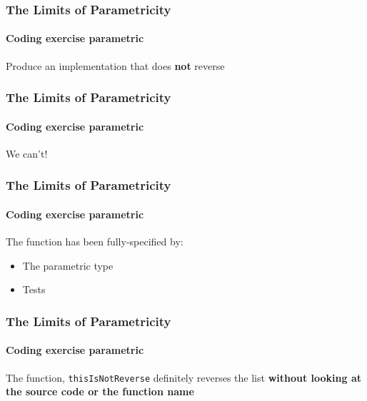 \begin{frame}[fragile]
\frametitle{The Limits of Parametricity}
\framesubtitle{Coding exercise \textemdash parametric}
\begin{block}{Produce an implementation that does \textbf{not} reverse}

\end{block}
\end{frame}

\begin{frame}[fragile]
\frametitle{The Limits of Parametricity}
\framesubtitle{Coding exercise \textemdash parametric}
\begin{center}
We can't!
\end{center}
\end{frame}

\begin{frame}[fragile]
\frametitle{The Limits of Parametricity}
\framesubtitle{Coding exercise \textemdash parametric}
\begin{block}{The function has been fully-specified by:}
\begin{itemize}
  \item The parametric type
  \item Tests
\end{itemize}
\end{block}
\end{frame}

\begin{frame}[fragile]
\frametitle{The Limits of Parametricity}
\framesubtitle{Coding exercise \textemdash parametric}
\begin{center}
The function, \lstinline{thisIsNotReverse} definitely reverses the list \textbf{without looking at the source code or the function name}
\end{center}
\end{frame}